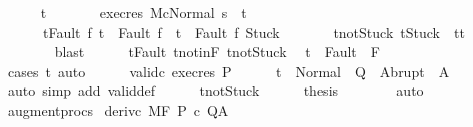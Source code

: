 \begin{isabellebody}
\ \ \ \ \isamarkupfalse%
\ t{\isacharprime}\ \isanewline
\ \ \ \ \ \ exec{\isacharunderscore}res{\isacharcolon}\ {\isachardoublequoteopen}{\isasymGamma}{\isacharbar}\isactrlbsub M\isactrlesub {\isasymturnstile}{\isasymlangle}c{\isacharcomma}Normal\ s{\isasymrangle}\ {\isasymRightarrow}\ t{\isacharprime}{\isachardoublequoteclose}\ \isanewline
\ \ \ \ \ \ t{\isacharunderscore}Fault{\isacharcolon}\ {\isachardoublequoteopen}{\isasymforall}f{\isachardot}\ t\ {\isacharequal}\ Fault\ f\ {\isasymlongrightarrow}\ t{\isacharprime}\ {\isasymin}\ {\isacharbraceleft}Fault\ f{\isacharcomma}\ Stuck{\isacharbraceright}{\isachardoublequoteclose}\ \isanewline
\ \ \ \ \ \ t{\isacharprime}{\isacharunderscore}notStuck{\isacharcolon}\ {\isachardoublequoteopen}t{\isacharprime}{\isasymnoteq}Stuck\ {\isasymlongrightarrow}\ t{\isacharprime}{\isacharequal}t{\isachardoublequoteclose}\isanewline
\ \ \ \ \ \ \isamarkupfalse%
\ blast\isanewline
\ \ \ \ \isamarkupfalse%
\ t{\isacharunderscore}Fault\ t{\isacharunderscore}notin{\isacharunderscore}F\ t{\isacharprime}{\isacharunderscore}notStuck\ \isamarkupfalse%
\ {\isachardoublequoteopen}t{\isacharprime}\ {\isasymnotin}\ Fault\ {\isacharbackquote}\ F{\isachardoublequoteclose}\isanewline
\ \ \ \ \ \ \isamarkupfalse%
\ {\isacharparenleft}cases\ t{\isacharprime}{\isacharparenright}\ auto\isanewline
\ \ \ \ \isamarkupfalse%
\ valid{\isacharunderscore}c\ exec{\isacharunderscore}res\ P\isanewline
\ \ \ \ \isamarkupfalse%
\ {\isachardoublequoteopen}t{\isacharprime}\ {\isasymin}\ Normal\ {\isacharbackquote}\ Q\ {\isasymunion}\ Abrupt\ {\isacharbackquote}\ A{\isachardoublequoteclose}\isanewline
\ \ \ \ \ \ \isamarkupfalse%
\ {\isacharparenleft}auto\ simp\ add{\isacharcolon}\ valid{\isacharunderscore}def{\isacharparenright}\isanewline
\ \ \ \ \isamarkupfalse%
\ t{\isacharprime}{\isacharunderscore}notStuck\isanewline
\ \ \ \ \isamarkupfalse%
\ {\isacharquery}thesis\isanewline
\ \ \ \ \ \ \isamarkupfalse%
\ auto\isanewline
\ \ \isamarkupfalse%
\isanewline
{}\isamarkupfalse%
%
\endisatagproof
{\isafoldproof}%
%
\isadelimproof
\isanewline
%
\endisadelimproof
\isanewline
{}\isamarkupfalse%
\ augment{\isacharunderscore}procs{\isacharcolon}\isanewline
{}\ deriv{\isacharunderscore}c{\isacharcolon}\ {\isachardoublequoteopen}{\isasymGamma}{\isacharbar}\isactrlbsub M\isactrlesub {\isacharcomma}{\isacharbraceleft}{\isacharbraceright}{\isasymturnstile}\isactrlbsub {\isacharslash}F\isactrlesub \ P\ c\ Q{\isacharcomma}A{\isachardoublequoteclose}\isanewline

\end{isabellebody}
